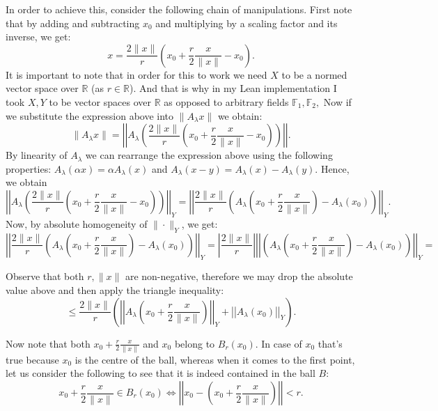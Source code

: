 \documentclass[11pt]{article}
\newcommand\R{\mathbb{R}}
\begin{document}
In order to achieve this, consider the following chain of manipulations.
First note that by adding and subtracting $x_0$ and multiplying by a scaling factor
and its inverse, we get:
 \[
x = \frac{2\|x\|}{r}\left( x_0 + \frac{r}{2}\frac{x}{\|x\|} - x_0 \right)
.\]
It is important to note that in order for this to work we need $X$ to be a normed
vector space over $\R$ (as  $r \in \R$). And that is why in my Lean implementation
I took $X, Y$ to be vector spaces over  $\R$ as opposed to arbitrary fields  $\mathbb{F}_1, \mathbb{F}_2,$
Now if we substitute the expression above into $\|A_\lambda x\|$ we obtain:
\[
\|A_\lambda x\| = \left|\left|A_\lambda\left(\frac{2\|x\|}{r}\left( x_0 + \frac{r}{2}\frac{x}{\|x\|} - x_0 \right)  \right) \right|\right|
.\]
By linearity of $A_\lambda$ we can rearrange the expression above using the following
properties: $A_\lambda\left( \alpha x \right) = \alpha A_\lambda\left( x \right)  $ and
$A_\lambda\left( x - y \right) = A_\lambda\left( x \right)  - A_\lambda\left( y \right)  $.
Hence, we obtain
\[
\left|\left|A_\lambda\left(\frac{2\|x\|}{r}\left( x_0 + \frac{r}{2}\frac{x}{\|x\|} - x_0 \right)  \right) \right|\right|_Y =
\left|\left| \frac{2\|x\|}{r} \left( A_\lambda\left( x_0 + \frac{r}{2}\frac{x}{\|x\|} \right) - A_\lambda(x_0)  \right) \right|\right|_Y
.\]
Now, by absolute homogeneity of $\|\cdot\|_Y$, we get:
\[
\left|\left| \frac{2\|x\|}{r} \left( A_\lambda\left( x_0 + \frac{r}{2}\frac{x}{\|x\|} \right) - A_\lambda(x_0)  \right) \right|\right|_Y =
\left| \frac{2\|x\|}{r} \right| \left|\left| \left( A_\lambda\left( x_0 + \frac{r}{2}\frac{x}{\|x\|} \right) - A_\lambda(x_0)  \right) \right|\right|_Y =
\]

Observe that both $ r, \|x\|$ are non-negative, therefore we may drop the absolute value above
and then apply the triangle inequality:
\begin{equation}
 \le \frac{2\|x\|}{r} \left( \left|\left| A_\lambda\left( x_0 + \frac{r}{2}\frac{x}{\|x\|} \right)
 \right|\right|_Y + \left|\left| A_\lambda(x_0)  \right|\right|_Y \right)
.\end{equation}

Now note that both $x_0 + \frac{r}{2}\frac{x}{\|x\|} $ and $x_0$ belong to $B_r(x_0)$.
In case of $x_0$ that's true because $x_0$ is the centre of the ball, whereas when it comes to the first point, let us
consider the following to see that it is indeed contained in the ball  $B$:
\[
  x_0 + \frac{r}{2}\frac{x}{\|x\|} \in B_r(x_0) \iff \left|\left|x_0 - \left(x_0 + \frac{r}{2}\frac{x}{\|x\|}   \right) \right|\right| < r
.\]
\end{document}
